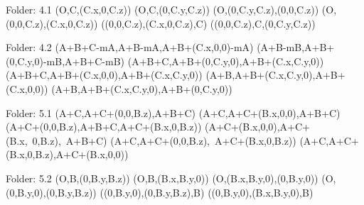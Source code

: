 Folder: 4.1
\left(O,C,\left(C.x,0,C.z\right)\right)
\left(O,C,\left(0,C.y,C.z\right)\right)
\left(O,\left(0,C.y,C.z\right),\left(0,0,C.z\right)\right)
\left(O,\left(0,0,C.z\right),\left(C.x,0,C.z\right)\right)
\left(\left(0,0,C.z\right),\left(C.x,0,C.z\right),C\right)
\left(\left(0,0,C.z\right),C,\left(0,C.y,C.z\right)\right)


Folder: 4.2
\left(A+B+C-mA,A+B-mA,A+B+\left(C.x,0,0\right)-mA\right)
\left(A+B-mB,A+B+\left(0,C.y,0\right)-mB,A+B+C-mB\right)
\left(A+B+C,A+B+\left(0,C.y,0\right),A+B+\left(C.x,C.y,0\right)\right)
\left(A+B+C,A+B+\left(C.x,0,0\right),A+B+\left(C.x,C.y,0\right)\right)
\left(A+B,A+B+\left(C.x,C.y,0\right),A+B+\left(C.x,0,0\right)\right)
\left(A+B,A+B+\left(C.x,C.y,0\right),A+B+\left(0,C.y,0\right)\right)


Folder: 5.1
\left(A+C,A+C+\left(0,0,B.z\right),A+B+C\right)
\left(A+C,A+C+\left(B.x,0,0\right),A+B+C\right)
\left(A+C+\left(0,0,B.z\right),A+B+C,A+C+\left(B.x,0,B.z\right)\right)
\left(A+C+\left(B.x,0,0\right),A+C+\left(B.x,\ 0,B.z\right),\ A+B+C\right)
\left(A+C,A+C+\left(0,0,B.z\right),\ A+C+\left(B.x,0,B.z\right)\right)
\left(A+C,A+C+\left(B.x,0,B.z\right),A+C+\left(B.x,0,0\right)\right)


Folder: 5.2
\left(O,B,\left(0,B.y,B.z\right)\right)
\left(O,B,\left(B.x,B.y,0\right)\right)
\left(O,\left(B.x,B.y,0\right),\left(0,B.y,0\right)\right)
\left(O,\left(0,B.y,0\right),\left(0,B.y,B.z\right)\right)
\left(\left(0,B.y,0\right),\left(0,B.y,B.z\right),B\right)
\left(\left(0,B.y,0\right),\left(B.x,B.y,0\right),B\right)


